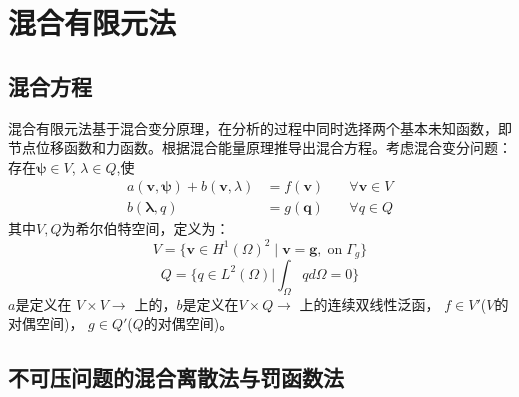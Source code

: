 \chapter{混合有限元法}
\section{混合方程}
混合有限元法基于混合变分原理，在分析的过程中同时选择两个基本未知函数，即节点位移函数和力函数。根据混合能量原理推导出混合方程。考虑混合变分问题：
存在$\boldsymbol \psi \in V$, $\lambda \in Q$,使
\begin{equation}
    \begin{aligned}
        a(\boldsymbol v, \boldsymbol \psi) + b(\boldsymbol v, \lambda) &= f(\boldsymbol v) \quad &\forall \boldsymbol v \in V \\
        b(\boldsymbol \lambda, q) &= g(\boldsymbol q) \quad &\forall q \in Q
    \end{aligned}
\end{equation}
其中$V, Q$为希尔伯特空间，定义为：
\begin{equation}
    V=\{\boldsymbol v \in H^1(\Omega)^2\;\vert\;\boldsymbol v = \boldsymbol g, \; \textrm{on} \; \Gamma_g\}
\end{equation}
\begin{equation}
    Q = \{q \in L^2(\Omega) \vert \int_{\Omega} q d\Omega = 0\}
\end{equation}
$a$是定义在 $V\times V\rightarrow$ 上的，$b$是定义在$V\times Q\rightarrow $ 上的连续双线性泛函， $f\in V'$($V$的对偶空间)， $g\in Q'$($Q$的对偶空间)。
\section{不可压问题的混合离散法与罚函数法}               
